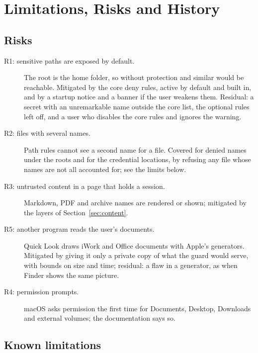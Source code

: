 \section{Limitations, Risks and History}
\label{sec:history}

\subsection{Risks}

\begin{description}
  \item[R1: sensitive paths are exposed by default.]  The root is the home folder, so without
        protection  and similar would be reachable.  Mitigated by the core deny
        rules, active by default and built in, and by a startup notice and a banner if the user
        weakens them.  Residual: a secret with an unremarkable name outside the core list, the optional
        rules left off, and a user who disables the core rules and ignores the warning.
  \item[R2: files with several names.]  Path rules cannot see a second name for a file.  Covered
        for denied names under the roots and for the credential locations, by refusing any file whose
        names are not all accounted for; see the limits below.
  \item[R3: untrusted content in a page that holds a session.]  Markdown, PDF and archive names are
        rendered or shown; mitigated by the layers of Section~\ref{sec:content}.
  \item[R5: another program reads the user's documents.]  Quick Look draws iWork and Office
        documents with Apple's generators.  Mitigated by giving it only a private copy of what the
        guard would serve, with bounds on size and time; residual: a flaw in a generator, as when
        Finder shows the same picture.
  \item[R4: permission prompts.]  macOS asks permission the first time for Documents, Desktop,
        Downloads and external volumes; the documentation says so.
\end{description}

\subsection{Known limitations}

